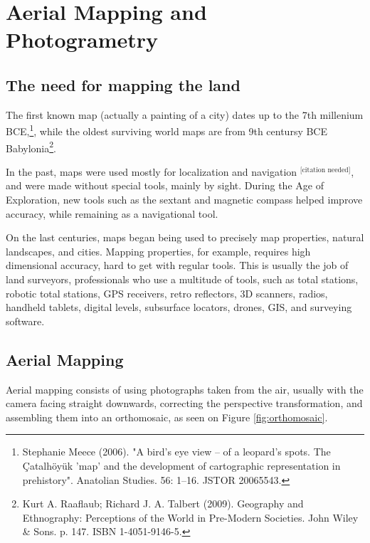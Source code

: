 

\chapter{Aerial Mapping and Photogrametry} \label{chap:AerialMapping}



\section{The need for mapping the land}
The first known map (actually a painting of a city) dates up to the 7th millenium BCE,\footnote{Stephanie Meece (2006). "A bird's eye view – of a leopard's spots. The Çatalhöyük 'map' and the development of cartographic representation in prehistory". Anatolian Studies. 56: 1–16. JSTOR 20065543.}, while the oldest surviving world maps are from 9th centursy BCE Babylonia\footnote{ Kurt A. Raaflaub; Richard J. A. Talbert (2009). Geography and Ethnography: Perceptions of the World in Pre-Modern Societies. John Wiley \& Sons. p. 147. ISBN 1-4051-9146-5.}.

In the past, maps were used mostly for localization and navigation $^{\text{[citation needed]}}$, and were made without special tools, mainly by sight. During the Age of Exploration, new tools such as the sextant and magnetic compass helped improve accuracy, while remaining as a navigational tool.

On the last centuries, maps began being used to precisely map properties, natural landscapes, and cities. Mapping properties, for example, requires high dimensional accuracy, hard to get with regular tools. This is usually the job of land surveyors, professionals who use a multitude of tools, such as total stations, robotic total stations, GPS receivers, retro reflectors, 3D scanners, radios, handheld tablets, digital levels, subsurface locators, drones, GIS, and surveying software.


\section{Aerial Mapping}
Aerial mapping consists of using photographs taken from the air, usually with the camera facing straight downwards, correcting the perspective transformation, and assembling them into an orthomosaic, as seen on Figure \ref{fig:orthomosaic}.

